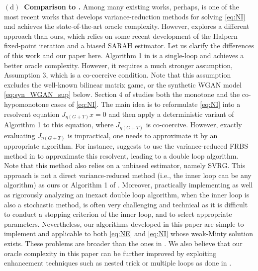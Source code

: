 \documentclass{article}
\theoremstyle{plain}
\theoremstyle{definition}
\theoremstyle{remark}
\begin{document}
\noindent\textbf{$\mathrm{(d)}$~Comparison to  \citep{cai2023variance}.}
Among many existing works, perhaps,  \citep{cai2023variance} is one of the most recent works that develops variance-reduction methods for solving \eqref{eq:NI} and achieves the state-of-the-art oracle complexity.
However,  \citep{cai2023variance} explores a different approach than ours, which relies on some recent development of the Halpern fixed-point iteration and a biased SARAH estimator.
Let us clarify the differences of this work and our paper here.
Algorithm 1 in \citep{cai2023variance} is a single-loop and achieves a better oracle complexity.
However, it requires a much stronger assumption, Assumption 3, which is a co-coercive condition. 
Note that this assumption excludes the well-known bilinear matrix game, or the synthetic WGAN model \eqref{eq:syn_WGAN_sup} below.
Section 4 of \citep{cai2023variance} studies both the monotone and the co-hypomonotone cases of \eqref{eq:NI}. 
The main idea is to reformulate \eqref{eq:NI} into a resolvent equation $J_{\eta(G+T)}x = 0$ and then apply a deterministic variant of Algorithm 1 to this equation, where $J_{\eta(G+T)}$ is co-coercive.
However, exactly evaluating $J_{\eta(G+T)}$ is impractical, one needs to approximate it by an appropriate algorithm.
For instance,  \citep{cai2023variance} suggests to use  the variance-reduced FRBS method in \citep{alacaoglu2022beyond} to approximate this resolvent, leading to a double loop algorithm. 
Note that this method also relies on a unbiased estimator, namely SVRG.
This approach is not a direct variance-reduced method (i.e., the inner loop can be any algorithm) as ours or Algorithm 1 of  \citep{cai2023variance}. 
Moreover, practically implementing as well as  rigorously analyzing an inexact double loop algorithm, when the inner loop is also a stochastic method, is often very challenging and technical as it is difficult to conduct a stopping criterion of the inner loop, and to select appropriate parameters. 
Nevertheless, our algorithms developed in this paper are simple to implement and applicable to both \eqref{eq:NE} and \eqref{eq:NI} whose weak-Minty solution exists.
These problems are broader than the ones in \citep{cai2023variance}.
We also believe that our oracle complexity in this paper can be further improved by exploiting enhancement techniques such as nested trick or multiple loops as done in \cite{cai2023variance,zhou2018stochastic}.
\end{document}
